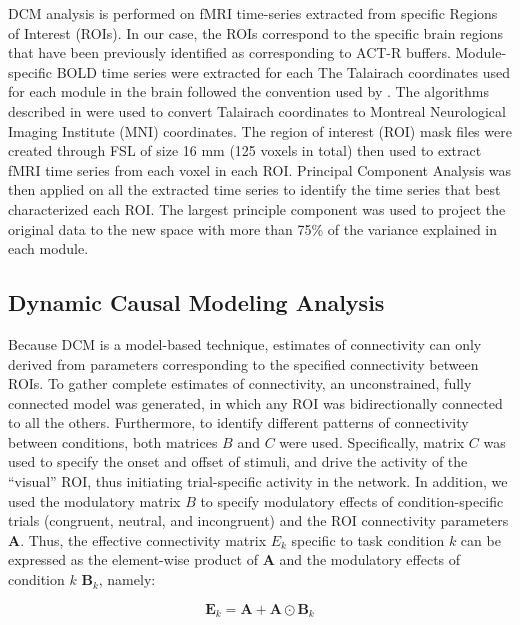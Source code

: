 \documentclass[10pt,letterpaper]{article}
\newcommand{\mat}[1]{\boldsymbol{#1}} %
\begin{document}
DCM analysis is performed on fMRI time-series extracted from specific Regions of Interest (ROIs). In our case, the ROIs correspond to the specific brain regions that have been previously identified as corresponding to ACT-R buffers. Module-specific BOLD time series were extracted for each  The Talairach coordinates used for each module in the brain followed the convention used by \cite{Anderson2008, Borst2017}. The algorithms described in \cite{Lacadie2008} were used to convert Talairach coordinates to Montreal Neurological Imaging Institute (MNI) coordinates. The region of interest (ROI) mask files were created through FSL \cite{Woolrich2009} of size 16 mm (125 voxels in total) then used to extract fMRI time series from each voxel in each ROI. Principal Component Analysis was then applied on all the extracted time series to identify the time series that best characterized each ROI. The largest principle component was used to project the original data to the new space with more than 75\% of the variance explained in each module. 

\subsection{Dynamic Causal Modeling Analysis}

Because DCM is a model-based technique, estimates of connectivity can only derived from parameters corresponding to the specified connectivity between ROIs.  To gather complete estimates of connectivity, an unconstrained, fully connected model was generated, in which any ROI was bidirectionally connected to all the others. Furthermore, to identify different patterns of connectivity between conditions, both matrices $B$ and $C$ were used. Specifically, matrix $C$ was used to specify the onset and offset of stimuli, and drive the activity  of the ``visual'' ROI, thus initiating trial-specific activity in the network. In addition, we used the modulatory matrix $B$ to specify modulatory effects of condition-specific trials (congruent, neutral, and incongruent) and the ROI connectivity parameters $\mat{A}$. Thus, the effective connectivity matrix $E_k$ specific to task condition $k$ can be expressed as the element-wise product of $\mat{A}$ and the modulatory effects of condition $k$ $\mat{B}_k$, namely:

\begin{equation}
\mat{E}_k = \mat{A} + \mat{A} \odot \mat{B}_k
\label{dcm:trick}
\end{equation}
\end{document}
